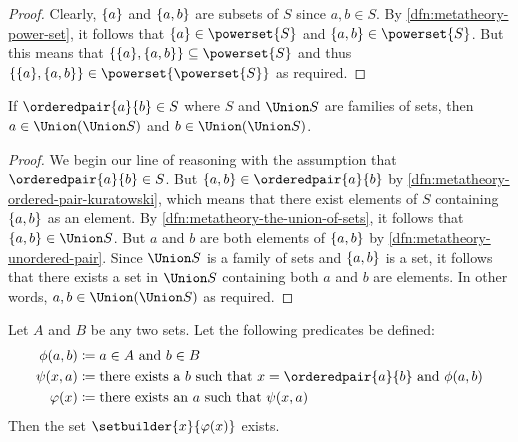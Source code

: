 \begin{proof}
    Clearly, \( \mleft\{ a \mright\} \) and \( \mleft\{ a, b \mright\} \) are subsets of \( S \) since \( a, b \in S\).
    By \cref{dfn:metatheory-power-set}, it follows that \( \mleft\{ a \mright\} \in \powerset{S} \) and \( \mleft\{ a, b \mright\} \in \powerset{S} \).
    But this means that \( \mleft\{ \mleft\{ a \mright\}, \mleft\{ a, b \mright\} \mright\} \subseteq \powerset{S} \) and thus
    \( \mleft\{ \mleft\{ a \mright\}, \mleft\{ a, b \mright\} \mright\} \in \powerset{\powerset{S}} \) as required.
\end{proof}

\begin{thm}
     \label{thm:metatheory-components-of-ordered-pair-must-belong-to-union-of-union-of-a-family-of-set}
    If \( \orderedpair{a}{b} \in S \) where \( S \) and \( \Union S \) are families of sets, then \( a \in \Union \mleft( \Union S \mright) \)
    and \( b \in \Union \mleft( \Union S \mright) \).
\end{thm}

\begin{proof}
    We begin our line of reasoning with the assumption that \( \orderedpair{a}{b} \in S \).
    But \( \mleft\{ a, b \mright\} \in \orderedpair{a}{b} \) by \cref{dfn:metatheory-ordered-pair-kuratowski},
    which means that there exist elements of \( S \) containing \( \mleft\{ a, b \mright\} \) as an element.
    By \cref{dfn:metatheory-the-union-of-sets}, it follows that \( \mleft\{ a, b \mright\} \in \Union S \).
    But \( a \) and \( b \) are both elements of \( \mleft\{ a, b \mright\} \) by \cref{dfn:metatheory-unordered-pair}.
    Since \( \Union S \) is a family of sets and \( \mleft\{ a, b \mright\} \) is a set, it follows that there exists a set in \( \Union S \)
    containing both \( a \) and \( b \) are elements. In other words, \( a, b \in \Union \mleft( \Union S \mright) \) as required.
\end{proof}

\begin{thm}
     \label{thm:metatheory-existence-of-cartesian-products}
    Let \( A \) and \( B \) be any two sets.
    Let the following predicates be defined:
    \begin{align*}
        \phi(a, b)    &\coloneq \text{\( a \in A \) and \( b \in B \)}\\
        \psi(x, a)    &\coloneq \text{there exists a \( b \) such that \( x = \orderedpair{a}{b} \) and \( \phi(a, b) \)}\\
        \varphi(x)    &\coloneq \text{there exists an \( a \) such that \( \psi(x, a) \)}
    \end{align*}
    Then the set \( \setbuilder{x}{\varphi(x)} \) exists.
\end{thm}

